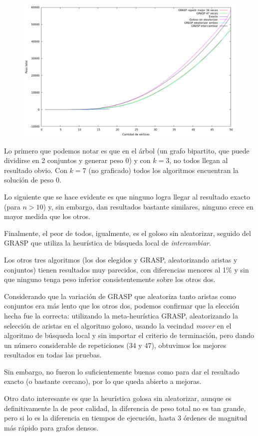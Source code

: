 \begin{figure}[H]
  \begin{center}
    \includegraphics[scale=0.35]{imagenes/ej6-denso-pesos-distintos-k7-peso.png}
  \end{center}
\end{figure}

Lo primero que podemos notar es que en el árbol (un grafo bipartito, que puede
dividirse en 2 conjuntos y generar peso 0) y con $k = 3$, no todos llegan al
resultado obvio. Con $k = 7$ (no graficado) todos los algoritmos encuentran la
solución de peso 0.

Lo siguiente que se hace evidente es que ninguno logra llegar al resultado
exacto (para $n > 10$) y, sin embargo, dan resultados bastante similares,
ninguno crece en mayor medida que los otros.

Finalmente, el peor de todos, igualmente, es el goloso sin aleatorizar, seguido
del GRASP que utiliza la heurística de búsqueda local de \textit{intercambiar}.

Los otros tres algoritmos (los dos elegidos y GRASP, aleatorizando aristas y
conjuntos) tienen resultados muy parecidos, con diferencias menores al 1\% y
sin que ninguno tenga peso inferior consistentemente sobre los otros dos.

Considerando que la variación de GRASP que aleatoriza tanto aristas como
conjuntos era más lento que los otros dos, podemos confirmar que la elección
hecha fue la correcta: utilizando la meta-heurística GRASP, aleatorizando la
selección de aristas en el algoritmo goloso, usando la vecindad \textit{mover}
en el algoritmo de búsqueda local y sin importar el criterio de terminación,
pero dando un número considerable de repeticiones (34 y 47), obtuvimos los
mejores resultados en todas las pruebas.

Sin embargo, no fueron lo suficientemente buenas como para dar el resultado
exacto (o bastante cercano), por lo que queda abierto a mejoras.

Otro dato interesante es que la heurística golosa sin aleatorizar, aunque es
definitivamente la de peor calidad, la diferencia de peso total no es tan grande,
pero si lo es la diferencia en tiempos de ejecución, hasta 3 órdenes de magnitud
más rápido para grafos densos.
